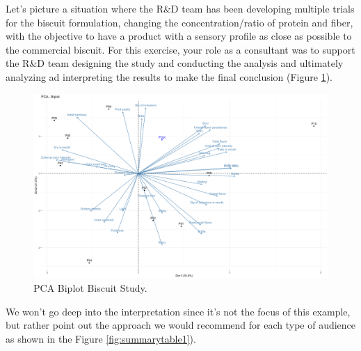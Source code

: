 \documentclass[
]{krantz}
\begin{document}
Let's picture a situation where the R\&D team has been developing multiple trials for the biscuit formulation, changing the concentration/ratio of protein and fiber, with the objective to have a product with a sensory profile as close as possible to the commercial biscuit. For this exercise, your role as a consultant was to support the R\&D team designing the study and conducting the analysis and ultimately analyzing ad interpreting the results to make the final conclusion (Figure \ref{fig:pca}).

\begin{figure}

{\centering \includegraphics[width=0.9\linewidth]{images/PCA} 

}

\caption{PCA Biplot Biscuit Study.}\label{fig:pca}
\end{figure}

We won't go deep into the interpretation since it's not the focus of this example, but rather point out the approach we would recommend for each type of audience as shown in the Figure \ref{fig:summarytable1}).
\end{document}
